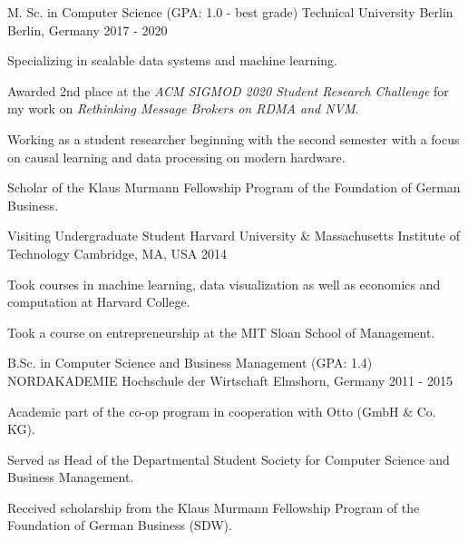 

\begin{cventries}

  \cventry
    {M. Sc. in Computer Science (GPA: 1.0 - best grade)} %
    {Technical University Berlin} %
    {Berlin, Germany} %
    {2017 - 2020} %
    {
      \begin{cvitems} %
        \item{Specializing in scalable data systems and machine learning.}
        \item{Awarded 2nd place at the \textit{ACM SIGMOD 2020 Student Research Challenge} for my work on \textit{Rethinking Message Brokers on RDMA and NVM}.}
        \item{Working as a student researcher beginning with the second semester with a focus on causal learning and data processing on modern hardware.}
        \item{Scholar of the Klaus Murmann Fellowship Program of the Foundation of German Business.}
      \end{cvitems}
    }

  \cventry
    {Visiting Undergraduate Student} %
    {Harvard University \& Massachusetts Institute of Technology} %
    {Cambridge, MA, USA} %
    {2014} %
    {
      \begin{cvitems} %
        \item{Took courses in machine learning, data visualization as well as economics and computation at Harvard College.}
        \item{Took a course on entrepreneurship at the MIT Sloan School of Management.}
      \end{cvitems}
    }

  \cventry
    {B.Sc. in Computer Science and Business Management (GPA: 1.4)} %
    {NORDAKADEMIE Hochschule der Wirtschaft} %
    {Elmshorn, Germany} %
    {2011 - 2015} %
    {
      \begin{cvitems} %
        \item{Academic part of the co-op program in cooperation with Otto (GmbH \& Co. KG).}
        \item{Served as Head of the Departmental Student Society for Computer Science and Business Management.}
        \item{Received scholarship from the Klaus Murmann Fellowship Program of the Foundation of German Business (SDW).}
      \end{cvitems}
    }

\end{cventries}
